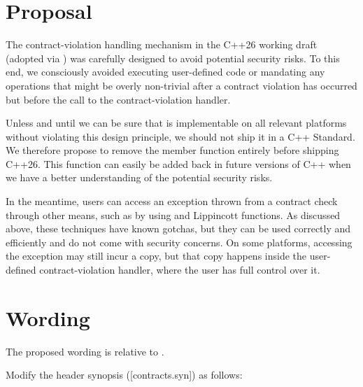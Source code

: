 \section{Proposal}

The contract-violation handling mechanism in the C++26 working draft (adopted via \cite{P2811R7}) was carefully designed to avoid potential security risks. To this end, we consciously avoided executing user-defined code or mandating any operations that might be overly non-trivial after a contract violation has occurred but before the call to the contract-violation handler.

Unless and until we can be sure that  is implementable on all relevant platforms without violating this design principle, we should not ship it in a C++ Standard. We therefore propose to remove the member function  entirely before shipping C++26. This function can easily be added back in future versions of C++ when we have a better understanding of the potential security risks.

In the meantime, users can access an exception thrown from a contract check through other means, such as by using  and Lippincott functions. As discussed above, these techniques have known gotchas, but they can be used correctly and efficiently and do not come with security concerns. On some platforms, accessing the exception may still incur a copy, but that copy happens inside the user-defined contract-violation handler, where the user has full control over it.

\section{Wording}


The proposed wording is relative to \cite{N5014}. 

Modify the header  synopsis ([contracts.syn]) as follows:

